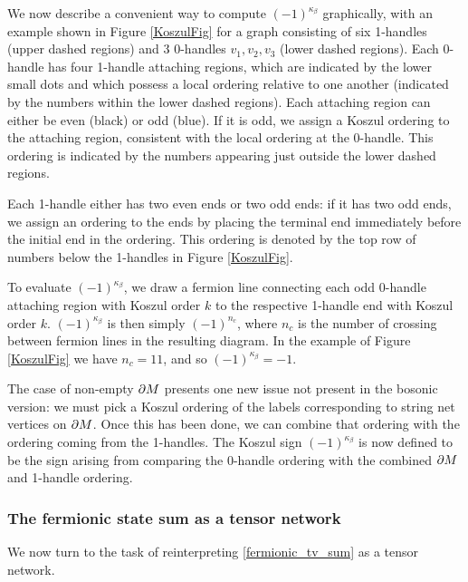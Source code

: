 \medskip

We now describe a convenient way to compute $(-1)^{\kappa_\beta}$ graphically, with an 
example shown in Figure \ref{KoszulFig} for a graph consisting of six 1-handles 
(upper dashed regions) and 3 0-handles $v_1,v_2,v_3$ (lower dashed regions). 
Each 0-handle has four 1-handle attaching regions, which are indicated by the lower small dots and 
which possess a local ordering relative to one another (indicated by the numbers within the lower dashed regions). 
Each attaching region can either be even (black) or odd (blue). 
If it is odd, we assign a Koszul ordering to the attaching
region, consistent with the local ordering at the 0-handle.
This ordering is indicated by the numbers appearing just outside the lower dashed regions.

Each 1-handle either has two even ends or two odd ends: if it has two odd ends, we assign an ordering 
to the ends by placing the terminal end immediately before the initial end in the ordering. This ordering
is denoted by the top row of numbers below the 1-handles in Figure \ref{KoszulFig}. 

To evaluate $(-1)^{\kappa_\beta}$, we draw a fermion line connecting each odd 0-handle attaching region
with Koszul order $k$ to the respective 1-handle end with Koszul order $k$. $(-1)^{\kappa_\beta}$ is then 
simply $(-1)^{n_c}$, where $n_c$ is the number of crossing between fermion lines in the resulting diagram. 
In the example of Figure \ref{KoszulFig} we have $n_c=11$, and so $(-1)^{\kappa_\beta}=-1$. 

\medskip

The case of non-empty $\partial M$ presents one new issue not present in the bosonic version:
we must pick a Koszul ordering of the labels corresponding to string net vertices on $\partial M$.
Once this has been done, we can combine that ordering with the ordering coming from the 1-handles.
The Koszul sign $(-1)^{\kappa_\beta}$ is now defined to be the sign arising from comparing 
the 0-handle ordering with the combined $\partial M$ and 1-handle ordering.


\subsubsection{The fermionic state sum as a tensor network}

We now turn to the task of reinterpreting \eqref{fermionic_tv_sum} as a tensor network.

\medskip

